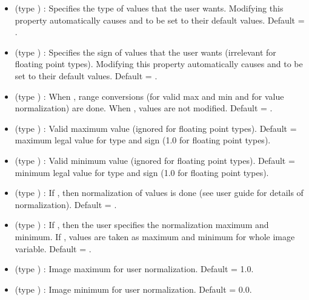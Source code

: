 \begin{itemize}

\item {} (type ) : Specifies the type
of values that the user wants. Modifying this property automatically
causes  and  to
be set to their default values. Default = .

\item {} (type ) :  Specifies the sign of
values that the user wants (irrelevant for floating point types).
Modifying this property automatically causes
 and  to be set to
their default values. Default = .

\item {} (type ) : When ,
range conversions (for valid max and min and for value normalization)
are done. When , values are not modified. Default =
.

\item {} (type ) : Valid maximum
value (ignored for floating point types). Default = maximum legal
value for type and sign (1.0 for floating point types).

\item {} (type ) : Valid minimum
value (ignored for floating point types). Default = minimum legal
value for type and sign (1.0 for floating point types).

\item {} (type ) : If ,
then normalization of values is done (see user guide for details of
normalization). Default = .

\item {} (type ) : If ,
then the user specifies the normalization maximum and minimum. If
, values are taken as maximum and minimum for whole image
variable. Default = .

\item {} (type ) : Image maximum
for user normalization. Default = 1.0.

\item {} (type ) : Image minimum
for user normalization. Default = 0.0.


\end{itemize}
